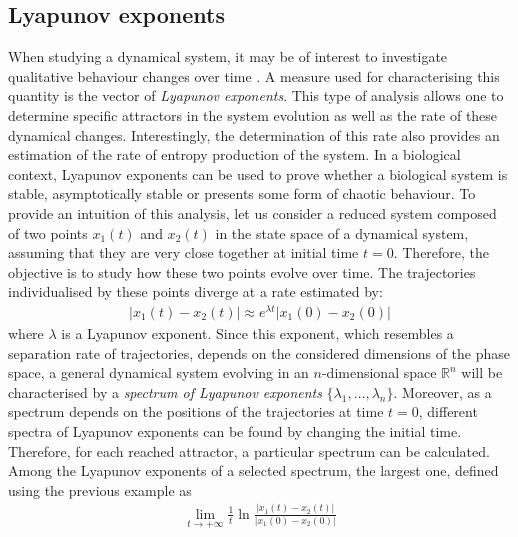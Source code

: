 \subsection{Lyapunov exponents} 
\label{subsection:Lyapunov exponents}
When studying a dynamical system, it may be of interest to investigate qualitative behaviour changes over time \citep{Aldridge2006}. A  measure used for characterising this quantity is the vector of \emph{Lyapunov exponents}. This type of analysis allows one to determine specific attractors in the system evolution as well as the rate of these dynamical changes. Interestingly, the determination of this rate also provides an estimation of the rate of entropy production of the system. In a biological context, Lyapunov exponents can be used to prove whether a biological system is stable, asymptotically stable or presents some form of chaotic behaviour. To provide an intuition of this analysis, let us consider a reduced system composed of two points $x_1(t)$ and $x_2(t)$ in the state space of a dynamical system, assuming that they are very close together at initial time $t=0$. Therefore, the objective is to study how these two points evolve over time. The trajectories individualised by these points diverge at a 
rate estimated by:
\begin{align}
  \label{eq:Lyapunov_exponents1}
  |x_1(t) - x_2(t)| \approx e^{\lambda t}|x_1(0) - x_2(0)|
\end{align}
where $\lambda$ is a Lyapunov exponent. Since this exponent, which resembles a separation rate of trajectories, depends on the considered dimensions of the phase space, a general dynamical system evolving in an $n$-dimensional space $\mathbb{R}^n$ will be characterised by a \emph{spectrum of Lyapunov exponents} $\{\lambda_1, \dots, \lambda_n\}$. Moreover, as a spectrum depends on the positions of the trajectories at time $t=0$, different spectra of Lyapunov exponents can be found by changing the initial time. Therefore, for each reached attractor, a particular spectrum can be calculated.\\
Among the Lyapunov exponents of a selected spectrum, the largest one, defined using the previous example as 
\begin{align}
  \label{eq:Lyapunov_exponents2}
  \lim_{t\to+\infty} \frac{1}{t} \ln \frac{|x_1(t) - x_2(t)|}{|x_1(0) - x_2(0)|} %
\end{align}
